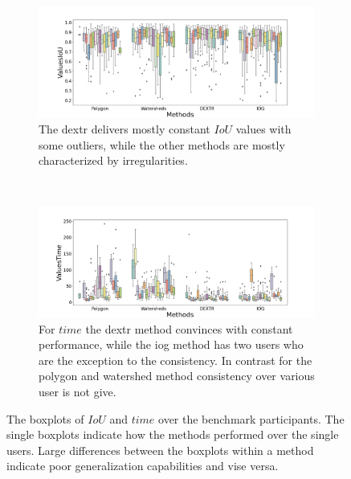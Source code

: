 \begin{figure} [h!]
	\centering
	\begin{subfigure}[t]{1.0\textwidth}
		\centering
		\includegraphics[width=\textwidth]{figures/chap53_all_users_iou.png}
		\caption{
			The \gls{dextr} delivers mostly constant $ IoU $ values with some outliers, while the other methods are mostly characterized by irregularities.
		}\label{fig:ch5:sec3:all_benchmark_iou}
	\end{subfigure}
	\\
	\begin{subfigure}[t]{1.0\textwidth}
		\centering
		\includegraphics[width=\textwidth]{figures/chap53_all_users_time.png}
		\caption{
			For $ time $ the \gls{dextr} method convinces with constant performance, while the \gls{iog} method has two users who are the exception to the consistency.
			In contrast for the polygon and watershed method consistency over various user is not give.			
		} \label{fig:ch5:sec3:all_benchmark_time}
	\end{subfigure}
	\caption[Boxplots of $ IoU $ and $ time $ over benchmark participants]{		
		The boxplots of $ IoU $ and $ time $ over the \getNumberBenchmarkParticipants \space benchmark participants.
		The single boxplots indicate how the methods performed over the single users. 
		Large differences between the boxplots within a method indicate poor generalization capabilities and vise versa.
	}\label{fig:ch5:sec3:all_benchmark}
\end{figure}

